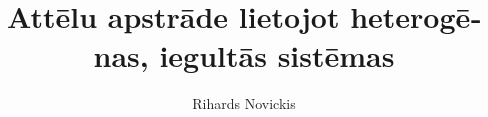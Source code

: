\usepackage{titlesec}

\usepackage{fontspec}
\usepackage{xunicode}
\usepackage{xltxtra}

\usepackage{polyglossia}
\setdefaultlanguage{latvian}

\title{Attēlu apstrāde lietojot heterogēnas, iegultās sistēmas}
\author{Rihards Novickis}
\def \advisor{
	  Zinātniskais vadītājs\\
      Datorzinātņu doktors\\
      \large{\MakeUppercase{M. Greitāns}}
}
\def \student_number{111REB756}
\def \programm_description{Elektronikas maģistra programmas students}
\def \university{Rīgas Tehniskā universitāte}
\def \faculty{Elektronikas un Telekomunikāciju fakultāte}
\def \city{Rīga}
\def \year{2016}